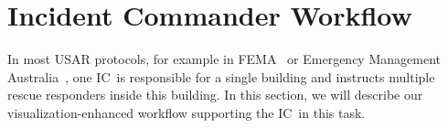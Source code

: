 \documentclass[conference,10pt,letter]{IEEEtran}
\def\IC{IC}
\begin{document}

\section{Incident Commander Workflow} \label{sec:workflow}
%
%
In most USAR protocols, for example in FEMA~\cite{fema08} or Emergency Management Australia~\cite{em35}, one \IC\ is responsible for a single building and instructs multiple rescue responders inside this building. In this section, we will describe our visualization-enhanced workflow supporting the \IC\ in this task.
\end{document}

